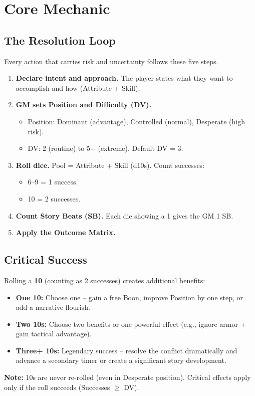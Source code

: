 \section{Core Mechanic}

\subsection{The Resolution Loop}

Every action that carries risk and uncertainty follows these five steps.

\begin{enumerate}
  \item \textbf{Declare intent and approach.} The player states what they want to accomplish and how (Attribute + Skill).
  \item \textbf{GM sets Position and Difficulty (DV).}
    \begin{itemize}
      \item Position: Dominant (advantage), Controlled (normal), Desperate (high risk).
      \item DV: 2 (routine) to 5+ (extreme). Default DV = 3.
    \end{itemize}
  \item \textbf{Roll dice.} Pool = Attribute + Skill (d10s). Count successes:
    \begin{itemize}
      \item 6--9 = 1 success.
      \item 10 = 2 successes.
    \end{itemize}
  \item \textbf{Count Story Beats (SB).} Each die showing a 1 gives the GM 1 SB.
  \item \textbf{Apply the Outcome Matrix.}
\end{enumerate}

\subsection{Critical Success}

Rolling a \textbf{10} (counting as 2 successes) creates additional benefits:
\begin{itemize}
  \item \textbf{One 10:} Choose one -- gain a free Boon, improve Position by one step, or add a narrative flourish.
  \item \textbf{Two 10s:} Choose two benefits or one powerful effect (e.g., ignore armor + gain tactical advantage).
  \item \textbf{Three+ 10s:} Legendary success -- resolve the conflict dramatically and advance a secondary timer or create a significant story development.
\end{itemize}
\textbf{Note:} 10s are never re-rolled (even in Desperate position). Critical effects apply only if the roll succeeds (Successes $\ge$ DV).

